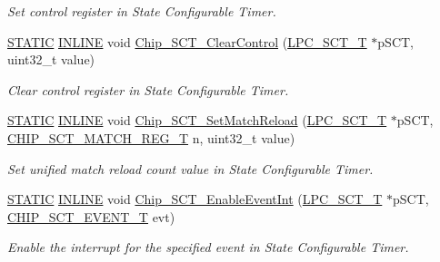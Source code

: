 \begin{DoxyCompactItemize}
\begin{DoxyCompactList}\small\item\em Set control register in State Configurable Timer. \end{DoxyCompactList}\item 
\hyperlink{group___l_p_c___types___public___macros_ga10b2d890d871e1489bb02b7e70d9bdfb}{S\+T\+A\+T\+IC} \hyperlink{spifi__18xx__43xx_8h_a2eb6f9e0395b47b8d5e3eeae4fe0c116}{I\+N\+L\+I\+NE} void \hyperlink{group___s_c_t__18_x_x__43_x_x_ga1138457e02586cc45358c3f980a050fe}{Chip\+\_\+\+S\+C\+T\+\_\+\+Clear\+Control} (\hyperlink{struct_l_p_c___s_c_t___t}{L\+P\+C\+\_\+\+S\+C\+T\+\_\+T} $\ast$p\+S\+CT, uint32\+\_\+t value)
\begin{DoxyCompactList}\small\item\em Clear control register in State Configurable Timer. \end{DoxyCompactList}\item 
\hyperlink{group___l_p_c___types___public___macros_ga10b2d890d871e1489bb02b7e70d9bdfb}{S\+T\+A\+T\+IC} \hyperlink{spifi__18xx__43xx_8h_a2eb6f9e0395b47b8d5e3eeae4fe0c116}{I\+N\+L\+I\+NE} void \hyperlink{group___s_c_t__18_x_x__43_x_x_ga0be93fdf3d06256aa10cf5c244dc139f}{Chip\+\_\+\+S\+C\+T\+\_\+\+Set\+Match\+Reload} (\hyperlink{struct_l_p_c___s_c_t___t}{L\+P\+C\+\_\+\+S\+C\+T\+\_\+T} $\ast$p\+S\+CT, \hyperlink{group___s_c_t__18_x_x__43_x_x_gab0308855f6bb30035f3165d01df90e27}{C\+H\+I\+P\+\_\+\+S\+C\+T\+\_\+\+M\+A\+T\+C\+H\+\_\+\+R\+E\+G\+\_\+T} n, uint32\+\_\+t value)
\begin{DoxyCompactList}\small\item\em Set unified match reload count value in State Configurable Timer. \end{DoxyCompactList}\item 
\hyperlink{group___l_p_c___types___public___macros_ga10b2d890d871e1489bb02b7e70d9bdfb}{S\+T\+A\+T\+IC} \hyperlink{spifi__18xx__43xx_8h_a2eb6f9e0395b47b8d5e3eeae4fe0c116}{I\+N\+L\+I\+NE} void \hyperlink{group___s_c_t__18_x_x__43_x_x_ga308d79c49dff3ce0d15969e95ffbd78f}{Chip\+\_\+\+S\+C\+T\+\_\+\+Enable\+Event\+Int} (\hyperlink{struct_l_p_c___s_c_t___t}{L\+P\+C\+\_\+\+S\+C\+T\+\_\+T} $\ast$p\+S\+CT, \hyperlink{group___s_c_t__18_x_x__43_x_x_ga9c76365e19f53e676f05cb7ccec143f7}{C\+H\+I\+P\+\_\+\+S\+C\+T\+\_\+\+E\+V\+E\+N\+T\+\_\+T} evt)
\begin{DoxyCompactList}\small\item\em Enable the interrupt for the specified event in State Configurable Timer. \end{DoxyCompactList}\item 

\end{DoxyCompactItemize}
